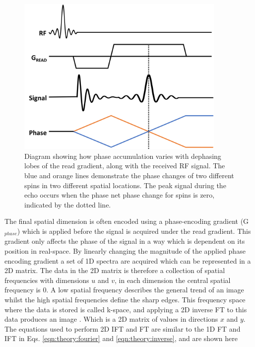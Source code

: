 \begin{figure}
    \centering
    \includegraphics[width=0.9\textwidth]{Figures/Theory/RePhasing.png}
    \caption{Diagram showing how phase accumulation varies with dephasing lobes of the read gradient, along with the received \ac{RF} signal. The blue and orange lines demonstrate the phase changes of two different spins in two different spatial locations. The peak signal during the echo occurs when the phase net phase change for spins is zero, indicated by the dotted line.}
    \label{fig:enter-label}
\end{figure}

The final spatial dimension is often encoded using a phase-encoding gradient (G$_{phase}$) which is applied before the signal is acquired under the read gradient. This gradient only affects the phase of the signal in a way which is dependent on its position in real-space. By linearly changing the magnitude of the applied phase encoding gradient a set of 1D spectra are acquired which can be represented in a 2D matrix. The data in the 2D matrix is therefore a collection of spatial frequencies with dimensions $u$ and $v$, in each dimension the central spatial frequency is 0. A low spatial frequency describes the general trend of an image whilst the high spatial frequencies define the sharp edges. This frequency space where the data is stored is called k-space, and applying a 2D inverse \ac{FT} to this data produces an image \cite{Lauterbur1973ImageResonance, Mansfield1977Multi-planarEchoes}. Which is a 2D matrix of values in directions $x$ and $y$. The equations used to perform 2D I\ac{FT} and \ac{FT} are similar to the 1D \ac{FT} and I\ac{FT} in Eqs. \ref{eqn:theory:fourier} and \ref{eqn:theory:inverse}, and are shown here

